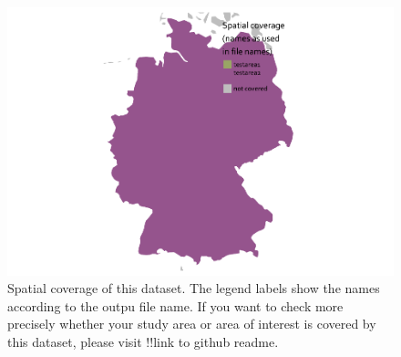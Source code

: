 \documentclass[fleqn,10pt]{wlscirep}
\begin{document}
\normalsize

\footnotesize

\begin{figure}[H]

{\centering \includegraphics[width=1\linewidth]{data_descriptor/tex/figure-studyareafigure-1} 

}

\caption{Spatial coverage of this dataset. The legend labels show the names according to the outpu file name. If you want to check more precisely whether your study area or area of interest is covered by this dataset, please visit !!link to github readme.}\label{fig:studyareafigure}
\end{figure}

\normalsize

\footnotesize
\end{document}
